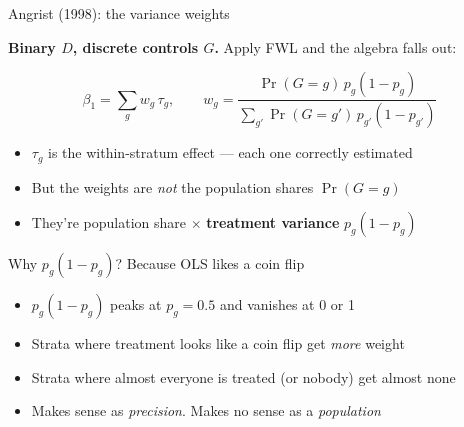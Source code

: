 \documentclass{beamer}
\newcommand{\highlight}[1]{\textcolor{accent}{\textbf{#1}}}
\begin{document}
\begin{frame}{Angrist (1998): the variance weights}

\textbf{Binary $D$, discrete controls $G$.} Apply FWL and the algebra falls out:

$$\beta_1 = \sum_g w_g \, \tau_g, \qquad
  w_g = \frac{\Pr(G=g)\, p_g(1-p_g)}{\sum_{g'}\Pr(G=g')\, p_{g'}(1-p_{g'})}$$

\begin{itemize}
\item $\tau_g$ is the within-stratum effect --- each one correctly estimated
\item But the weights are \emph{not} the population shares $\Pr(G=g)$
\item They're population share $\times$ \highlight{treatment variance} $p_g(1-p_g)$
\end{itemize}

\end{frame}


\begin{frame}{Why $p_g(1-p_g)$? Because OLS likes a coin flip}

\centering
{}

\vspace{1em}
\raggedright

\begin{itemize}
\item $p_g(1-p_g)$ peaks at $p_g = 0.5$ and vanishes at 0 or 1
\item Strata where treatment looks like a coin flip get \emph{more} weight
\item Strata where almost everyone is treated (or nobody) get almost none
\item Makes sense as \emph{precision}. Makes no sense as a \emph{population}
\end{itemize}

\end{frame}
\end{document}
